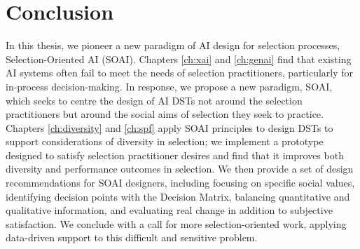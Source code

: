 \section{Conclusion}
In this thesis, we pioneer a new paradigm of AI design for selection processes, Selection-Oriented AI (SOAI). Chapters \ref{ch:xai} and \ref{ch:genai} find that existing AI systems often fail to meet the needs of selection practitioners, particularly for in-process decision-making. In response, we propose a new paradigm, SOAI, which seeks to centre the design of AI DSTs not around the selection practitioners but around the social aims of selection they seek to practice. Chapters \ref{ch:diversity} and \ref{ch:spf} apply SOAI principles to design DSTs to support considerations of diversity in selection; we implement a prototype designed to satisfy selection practitioner desires and find that it improves both diversity and performance outcomes in selection. We then provide a set of design recommendations for SOAI designers, including focusing on specific social values, identifying decision points with the Decision Matrix, balancing quantitative and qualitative information, and evaluating real change in addition to subjective satisfaction. We conclude with a call for more selection-oriented work, applying data-driven support to this difficult and sensitive problem.

